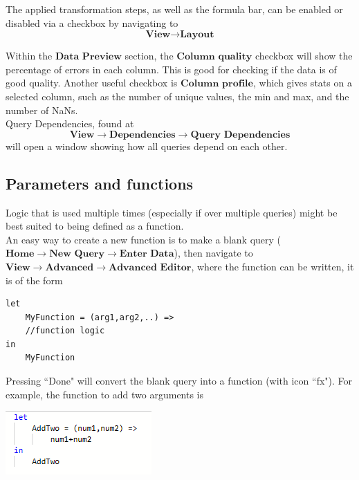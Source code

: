 \documentclass[10pt, openany, twocolumn]{book}
\begin{document}
The applied transformation steps, as well as the formula bar, can be enabled or disabled via a checkbox by navigating to 
$$\textbf{View} \rightarrow \textbf{Layout}$$

Within the $\textbf{Data Preview}$ section, the $\textbf{Column quality}$ checkbox will show the percentage of errors in each column. This is good for checking if the data is of good quality. Another useful checkbox is $\textbf{Column profile}$, which gives stats on a selected column, such as the number of unique values, the min and max, and the number of NaNs.\\

Query Dependencies, found at 
$$\textbf{View} \rightarrow \textbf{Dependencies} \rightarrow \textbf{Query Dependencies}$$
will open a window showing how all queries depend on each other.

\subsection*{Parameters and functions}

Logic that is used multiple times (especially if over multiple queries) might be best suited to being defined as a function.\\

An easy way to create a new function is to make a blank query ($\textbf{Home} \rightarrow \textbf{New Query} \rightarrow \textbf{Enter Data}$), then navigate to $\textbf{View} \rightarrow \textbf{Advanced} \rightarrow \textbf{Advanced Editor}$, where the function can be written, it is of the form

\begin{lstlisting}[]
let
    MyFunction = (arg1,arg2,..) =>
    //function logic 
in
    MyFunction
\end{lstlisting}

Pressing ``Done" will convert the blank query into a function (with icon ``fx"). For example, the function to add two arguments is
\begin{center}
    \includegraphics[width = 0.6\columnwidth]{images/AddCustomFunction.png}
\end{center}
\end{document}
